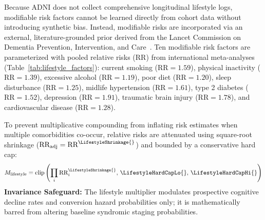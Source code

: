 

Because ADNI does not collect comprehensive longitudinal lifestyle logs, modifiable risk factors cannot be learned directly from cohort data without introducing synthetic bias. Instead, modifiable risks are incorporated via an external, literature-grounded prior derived from the Lancet Commission on Dementia Prevention, Intervention, and Care~\cite{livingston2020lancet,livingston2024lancet}. Ten modifiable risk factors are parameterized with pooled relative risks (RR) from international meta-analyses (Table~\ref{tab:lifestyle_factors}): current smoking ($\text{RR}=1.59$), physical inactivity ($\text{RR}=1.39$), excessive alcohol ($\text{RR}=1.19$), poor diet ($\text{RR}=1.20$), sleep disturbance ($\text{RR}=1.25$), midlife hypertension ($\text{RR}=1.61$), type 2 diabetes ($\text{RR}=1.52$), depression ($\text{RR}=1.91$), traumatic brain injury ($\text{RR}=1.78$), and cardiovascular disease ($\text{RR}=1.28$).

To prevent multiplicative compounding from inflating risk estimates when multiple comorbidities co-occur, relative risks are attenuated using square-root shrinkage ($\text{RR}_{\text{adj}} = \text{RR}^{\LifestyleShrinkage{}}$) and bounded by a conservative hard cap:
\begin{equation}
    M_{\text{lifestyle}} = \text{clip}\left(\prod_{i} \text{RR}_{i}^{\LifestyleShrinkage{}}, \, \LifestyleHardCapLo{}, \, \LifestyleHardCapHi{}\right)
\end{equation}
\textbf{Invariance Safeguard:} The lifestyle multiplier modulates prospective cognitive decline rates and conversion hazard probabilities only; it is mathematically barred from altering baseline syndromic staging probabilities.

